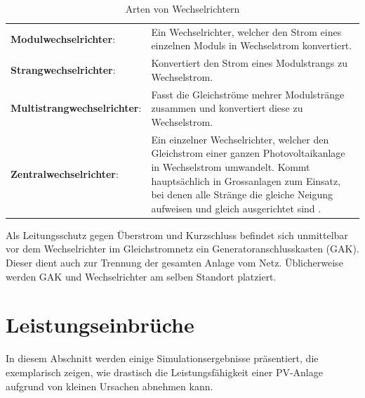 \begin{table}[h!tb]
    \centering
    \caption{Arten von Wechselrichtern}
    \label{tab:inverters}
    \begin{tabular}{p{50mm}p{70mm}}
        \toprule
        \textbf{Modulwechselrichter}: &
        Ein  Wechselrichter,  welcher  den  Strom eines  einzelnen  Moduls  in
        Wechselstrom konvertiert. \\

        \textbf{Strangwechselrichter}: &
        Konvertiert den Strom eines Modulstrangs zu Wechselstrom. \\

        \textbf{Multistrangwechselrichter}: &
        Fasst   die   Gleichstr\"ome   mehrer  Modulstr\"ange   zusammen   und
        konvertiert diese zu Wechselstrom. \\

        \textbf{Zentralwechselrichter}: &
        Ein  einzelner Wechselrichter,  welcher den  Gleichstrom einer  ganzen
        Photovoltaikanlage in Wechselstrom umwandelt. Kommt haupts\"achlich in
        Grossanlagen zum Einsatz, bei denen alle Str\"ange die gleiche Neigung
        aufweisen und gleich ausgerichtet sind \cite{ref:pv:ratgeber}.\\
        \bottomrule
    \end{tabular}
\end{table}

Als Leitungsschutz gegen \"Uberstrom und Kurzschluss befindet sich unmittelbar
vor  dem   Wechselrichter  im  Gleichstromnetz   ein  Generatoranschlusskasten
(GAK). Dieser   dient   auch   zur    Trennung   der   gesamten   Anlage   vom
Netz. \"Ublicherweise  werden  GAK  und   Wechselrichter  am  selben  Standort
platziert.


\clearpage
\section{Leistungseinbr\"uche}
\label{sec:shadedCells}

In  diesem Abschnitt  werden einige  Simulationsergebnisse pr\"asentiert,  die
exemplarisch zeigen,  wie drastisch  die Leistungsf\"ahigkeit  einer PV-Anlage
aufgrund von kleinen Ursachen abnehmen kann.

